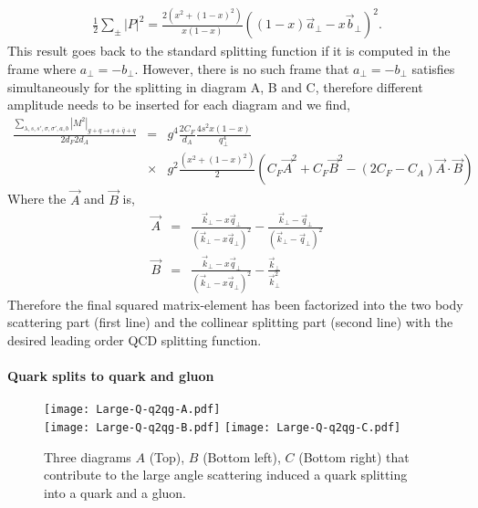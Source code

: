 \begin{eqnarray}
\frac{1}{2}\sum_\pm |P|^2 = \frac{2(x^2 + (1-x)^2)}{x(1-x)} \left((1-x)\vec{a}_\perp-x\vec{b}_\perp\right)^2.
\end{eqnarray}
This result goes back to the standard splitting function if it is computed in the frame where $a_\perp = -b_\perp$. 
However, there is no such frame that $a_\perp = -b_\perp$ satisfies simultaneously for the splitting in diagram A, B and C, therefore different amplitude needs to be inserted for each diagram and we find,
\begin{eqnarray}
\frac{\sum_{\lambda, s, s', \sigma, \sigma', a, b}|M^2|_{g+q\rightarrow q+\bar{q}+q}}{2d_F 2d_A} &=& g^4 \frac{2C_F}{d_A}\frac{4s^2 x(1-x)}{q_\perp^4}  \\\nonumber
&\times& g^2\frac{(x^2+(1-x)^2)}{2} \left(C_F \vec{A}^2 + C_F \vec{B}^2 - (2C_F- C_A)\vec{A}\cdot\vec{B}\right)
\end{eqnarray}
Where the $\vec{A}$ and $\vec{B}$ is,
\begin{eqnarray}
\vec{A} &=& \frac{\vec{k}_\perp - x\vec{q}_\perp}{(\vec{k}_\perp - x\vec{q}_\perp)^2} -  \frac{\vec{k}_\perp - \vec{q}_\perp}{(\vec{k}_\perp - \vec{q}_\perp)^2} \\
\vec{B} &=& \frac{\vec{k}_\perp - x\vec{q}_\perp}{(\vec{k}_\perp - x\vec{q}_\perp)^2} -  \frac{\vec{k}_\perp}{\vec{k}_\perp^2}
\end{eqnarray}
Therefore the final squared matrix-element has been factorized into the two body scattering part (first line) and the collinear splitting part (second line) with the desired leading order QCD splitting function. 

\paragraph*{Quark splits to quark and gluon}
\begin{figure}
\centering
\texttt{[image: Large-Q-q2qg-A.pdf]}\\
\vspace{1em}
\texttt{[image: Large-Q-q2qg-B.pdf]}\hfill
\texttt{[image: Large-Q-q2qg-C.pdf]}
\caption{Three diagrams $A$ (Top), $B$ (Bottom left), $C$ (Bottom right) that contribute to the large angle scattering induced a quark splitting into a quark and a gluon.}
\label{fig:feyn-q2qg}
\end{figure}


